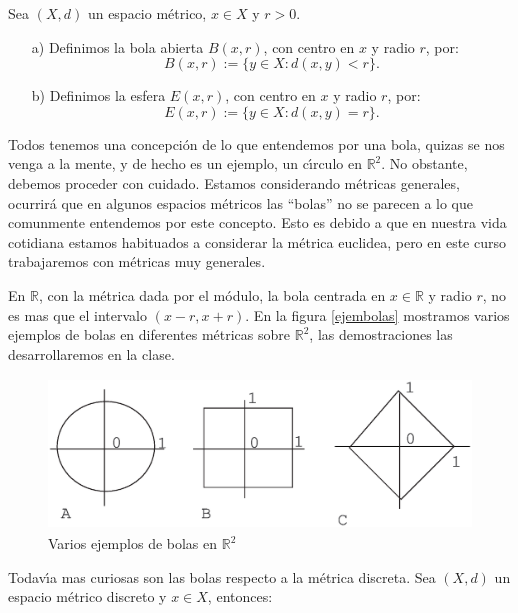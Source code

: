 \begin{definicion} Sea $(X,d)$ un espacio m\'etrico, $x\in X$ y
$r>0$.
\begin{itemize}
\item[a)]Definimos la bola abierta $B(x,r)$, con centro en $x$ y radio
$r$, por:
\[B(x,r):=\{y\in X:d(x,y)<r\}.\]
\item[b)]Definimos la esfera $E(x,r)$, con centro en $x$ y radio
$r$, por:
\[E(x,r):=\{y\in X:d(x,y)=r\}.\]
\end{itemize}
\end{definicion}

Todos tenemos una concepci\'on de lo que entendemos por una bola,
quizas se nos venga a la mente, y de hecho es un ejemplo, un
c\'{\i}rculo en $\mathbb{R}^2$. No obstante, debemos proceder con
cuidado. Estamos considerando m\'etricas generales, ocurrir\'a que
en algunos espacios m\'etricos las  ``bolas'' no se parecen a lo
que comunmente entendemos por este concepto. Esto es debido a que
en nuestra vida cotidiana estamos habituados a considerar la
m\'etrica euclidea, pero en este curso trabajaremos con m\'etricas
muy generales.

En $\mathbb{R}$, con la m\'etrica dada por el m\'odulo, la bola
centrada en $x\in\mathbb{R}$ y radio $r$, no es mas que el
intervalo $(x-r,x+r)$. En la figura \vref{ejembolas}  mostramos
varios ejemplos de bolas en diferentes m\'etricas sobre
$\mathbb{R}^2$, las demostraciones las desarrollaremos en la
clase.

\begin{figure}[h]
\begin{center}
		\includegraphics[height=4cm, width=12cm]{bolas.eps}
		\caption{Varios ejemplos de bolas en
		$\mathbb{R}^2$}\label{ejembolas}
\end{center}
\end{figure}
Todav\'{\i}a mas curiosas son las bolas respecto a la m\'etrica
discreta. Sea $(X,d)$ un espacio m\'etrico discreto y $x\in X$,
entonces:

